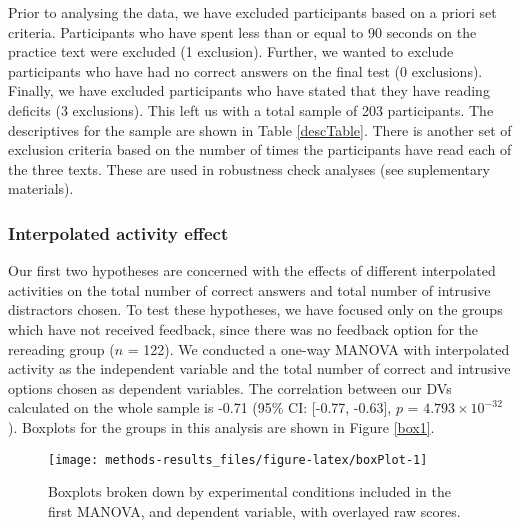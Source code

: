 \documentclass[11pt,]{article}
\begin{document}
Prior to analysing the data, we have excluded participants based on a
priori set criteria. Participants who have spent less than or equal to
90 seconds on the practice text were excluded (1 exclusion). Further, we
wanted to exclude participants who have had no correct answers on the
final test (0 exclusions). Finally, we have excluded participants who
have stated that they have reading deficits (3 exclusions). This left us
with a total sample of 203 participants. The descriptives for the sample
are shown in Table \ref{descTable}. There is another set of exclusion
criteria based on the number of times the participants have read each of
the three texts. These are used in robustness check analyses (see
suplementary materials).

\hypertarget{interpolated-activity-effect}{%
\subsubsection{Interpolated activity
effect}\label{interpolated-activity-effect}}

Our first two hypotheses are concerned with the effects of different
interpolated activities on the total number of correct answers and total
number of intrusive distractors chosen. To test these hypotheses, we
have focused only on the groups which have not received feedback, since
there was no feedback option for the rereading group (\(n\) = 122). We
conducted a one-way MANOVA with interpolated activity as the independent
variable and the total number of correct and intrusive options chosen as
dependent variables. The correlation between our DVs calculated on the
whole sample is -0.71 (95\% CI: {[}-0.77, -0.63{]}, \(p\) =
\(4.793\times 10^{-32}\)). Boxplots for the groups in this analysis are
shown in Figure \ref{box1}.

\begin{figure*}[h]

{\centering \texttt{[image: methods-results\_files/figure-latex/boxPlot-1]} 

}

\caption{\label{box1} Boxplots broken down by experimental conditions included in the first MANOVA, and dependent variable, with overlayed raw scores.}\label{fig:boxPlot}
\end{figure*}
\end{document}

